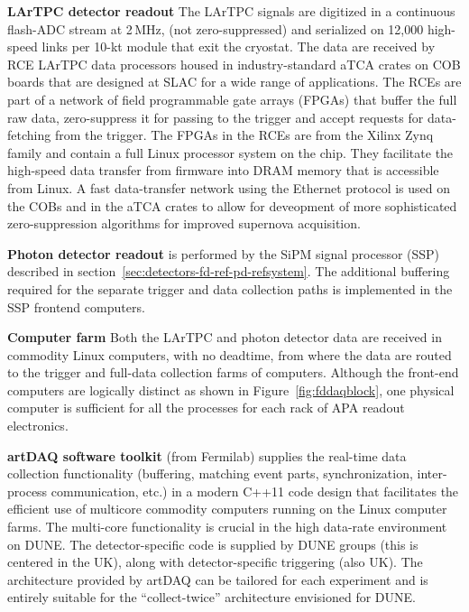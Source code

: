 {\bf LArTPC detector readout} The LArTPC signals are digitized in a
continuous flash-ADC stream at 2\,MHz, (not zero-suppressed) and
serialized on 12,000 high-speed links per 10-kt module that exit the
cryostat.
The data
are received by RCE LArTPC data processors %
housed in
industry-standard aTCA crates on COB boards that are designed at SLAC
for a wide range of applications.  The RCEs are part of a network of
field programmable gate arrays (FPGAs) that buffer the full raw data,
zero-suppress it for passing to the trigger and accept requests for
data-fetching from the trigger.  The FPGAs in the RCEs are from the
Xilinx Zynq family and contain a full Linux processor system on the
chip.  They facilitate the high-speed data transfer from firmware into
DRAM memory that is accessible from Linux.  A fast data-transfer
network using the Ethernet protocol is used on the COBs and in the
aTCA crates to allow for deveopment of more sophisticated zero-suppression algorithms
for improved supernova acquisition.

{\bf Photon detector readout} is performed by the SiPM signal
processor (SSP) described in
section~\ref{sec:detectors-fd-ref-pd-refsystem}.  The additional
buffering required for the separate trigger and data collection paths
is implemented in the SSP frontend computers.

{\bf Computer farm} Both the LArTPC and photon detector data are
received in commodity Linux computers, with no deadtime, from where
the data are routed to the trigger and full-data collection farms of
computers.  Although the front-end computers are logically distinct as
shown in Figure~\ref{fig:fddaqblock}, one physical computer is
sufficient for all the processes for each rack of APA readout
electronics. 

{\bf artDAQ software toolkit} (from Fermilab) supplies the real-time
data collection functionality (buffering, matching event parts,
synchronization, inter-process communication, etc.) in a modern C++11
code design that facilitates the efficient use of multicore commodity
computers running on the Linux computer farms.  The multi-core
functionality is crucial in the high data-rate environment on DUNE.  
The detector-specific
code is supplied by DUNE groups (this is centered in the UK), along
with detector-specific triggering (also UK).  The architecture
provided by artDAQ can be tailored for each experiment and is entirely
suitable for the ``collect-twice'' architecture envisioned for DUNE.

